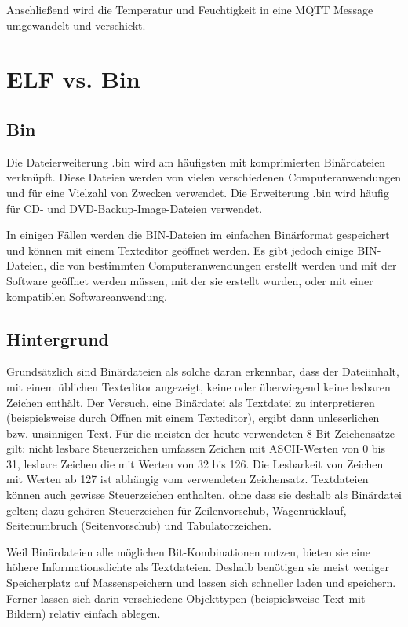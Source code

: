 Anschließend wird die Temperatur und Feuchtigkeit in eine MQTT Message umgewandelt und verschickt.

\section{ELF vs. Bin}

\subsection{Bin}
Die Dateierweiterung .bin wird am häufigsten mit komprimierten Binärdateien verknüpft. Diese Dateien werden von vielen verschiedenen Computeranwendungen und für eine Vielzahl von Zwecken verwendet. Die Erweiterung .bin wird häufig für CD- und DVD-Backup-Image-Dateien verwendet.

In einigen Fällen werden die BIN-Dateien im einfachen Binärformat gespeichert und können mit einem Texteditor geöffnet werden. Es gibt jedoch einige BIN-Dateien, die von bestimmten Computeranwendungen erstellt werden und mit der Software geöffnet werden müssen, mit der sie erstellt wurden, oder mit einer kompatiblen Softwareanwendung.\cite{file.org_bin}

\subsection{Hintergrund}
Grundsätzlich sind Binärdateien als solche daran erkennbar, dass der Dateiinhalt, mit einem üblichen Texteditor angezeigt, keine oder überwiegend keine lesbaren Zeichen enthält. Der Versuch, eine Binärdatei als Textdatei zu interpretieren (beispielsweise durch Öffnen mit einem Texteditor), ergibt dann unleserlichen bzw. unsinnigen Text. Für die meisten der heute verwendeten 8-Bit-Zeichensätze gilt: nicht lesbare Steuerzeichen umfassen Zeichen mit ASCII-Werten von 0 bis 31, lesbare Zeichen die mit Werten von 32 bis 126. Die Lesbarkeit von Zeichen mit Werten ab 127 ist abhängig vom verwendeten Zeichensatz. Textdateien können auch gewisse Steuerzeichen enthalten, ohne dass sie deshalb als Binärdatei gelten; dazu gehören Steuerzeichen für Zeilenvorschub, Wagenrücklauf, Seitenumbruch (Seitenvorschub) und Tabulatorzeichen.

Weil Binärdateien alle möglichen Bit-Kombinationen nutzen, bieten sie eine höhere Informationsdichte als Textdateien. Deshalb benötigen sie meist weniger Speicherplatz auf Massenspeichern und lassen sich schneller laden und speichern. Ferner lassen sich darin verschiedene Objekttypen (beispielsweise Text mit Bildern) relativ einfach ablegen.

